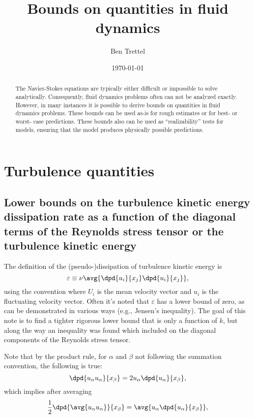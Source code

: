 \documentclass[ccbysa,note,git]{bmtreport}
\title{Bounds on quantities in fluid dynamics}
\author{Ben Trettel}
\date{\today}
\begin{document}
\maketitle
\begin{abstract}
The Navier-Stokes equations are typically either difficult or impossible to solve analytically. Consequently, fluid dynamics problems often can not be analyzed exactly. However, in many instances it is possible to derive bounds on quantities in fluid dynamics problems. These bounds can be used as-is for rough estimates or for best- or worst- case predictions. These bounds also can be used as ``realizability'' tests for models, ensuring that the model produces physically possible predictions.
\end{abstract}

\section{Turbulence quantities}

\subsection{Lower bounds on the turbulence kinetic energy dissipation rate as a function of the diagonal terms of the Reynolds stress tensor or the turbulence kinetic energy}

The definition of the (pseudo-)dissipation of turbulence kinetic energy is
\begin{equation}
   \varepsilon \equiv \nu \avg{\dpd{u_i}{x_j} \dpd{u_i}{x_j}},
\end{equation}
using the convention where $U_i$ is the mean velocity vector and $u_i$ is the fluctuating velocity vector. Often it's noted that $\varepsilon$ has a lower bound of zero, as can be demonstrated in various ways (e.g., Jensen's inequality). The goal of this note is to find a tighter rigorous lower bound that is only a function of $k$, but along the way an inequality was found which included on the diagonal components of the Reynolds stress tensor.

Note that by the product rule, for $\alpha$ and $\beta$ not following the summation convention, the following is true:
\begin{equation}
   \dpd{u_\alpha u_\alpha}{x_\beta} = 2 u_\alpha \dpd{u_\alpha}{x_\beta}, %
\end{equation}
which implies after averaging
\begin{equation}
   \frac{1}{2} \dpd{\avg{u_\alpha u_\alpha}}{x_\beta} = \avg{u_\alpha \dpd{u_\alpha}{x_\beta}}, \label{eq:diag to individual}
\end{equation}
\end{document}

